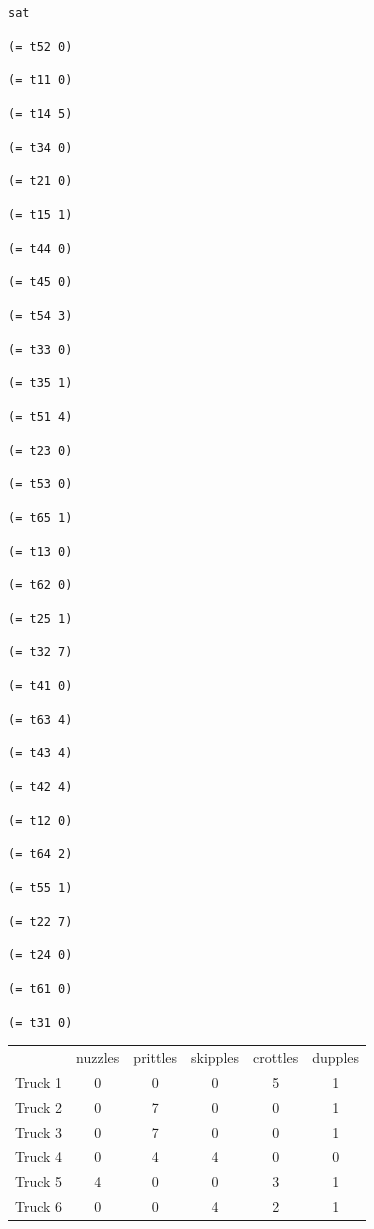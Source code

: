 \documentclass[11pt]{article}
\begin{document}
{\footnotesize

{\tt sat}

{\tt (= t52 0)}

{\tt (= t11 0)}

{\tt (= t14 5)}

{\tt (= t34 0)}

{\tt (= t21 0)}

{\tt (= t15 1)}

{\tt (= t44 0)}

{\tt (= t45 0)}

{\tt (= t54 3)}

{\tt (= t33 0)}

{\tt (= t35 1)}

{\tt (= t51 4)}

{\tt (= t23 0)}

{\tt (= t53 0)}

{\tt (= t65 1)}

{\tt (= t13 0)}

{\tt (= t62 0)}

{\tt (= t25 1)}

{\tt (= t32 7)}

{\tt (= t41 0)}

{\tt (= t63 4)}

{\tt (= t43 4)}

{\tt (= t42 4)}

{\tt (= t12 0)}

{\tt (= t64 2)}

{\tt (= t55 1)}

{\tt (= t22 7)}

{\tt (= t24 0)}

{\tt (= t61 0)}

{\tt (= t31 0)}

}

\begin{table}
  \centering
  \begin{tabular}{|l|c|c|c|c|c|}
    \hline
     & nuzzles & prittles & skipples & crottles & dupples \\
    Truck 1 & 0 & 0 & 0 & 5 & 1 \\
    Truck 2 & 0 & 7 & 0 & 0 & 1 \\
    Truck 3 & 0 & 7 & 0 & 0 & 1 \\
    Truck 4 & 0 & 4 & 4 & 0 & 0 \\
    Truck 5 & 4 & 0 & 0 & 3 & 1 \\
    Truck 6 & 0 & 0 & 4 & 2 & 1 \\
    \hline
  \end{tabular}
\end{table}
\end{document}
